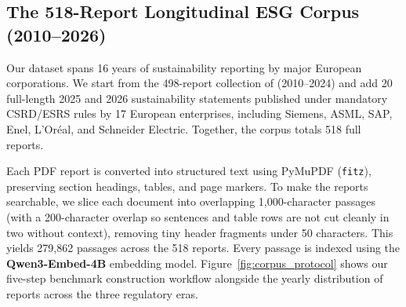 \documentclass[11pt,letterpaper]{article}
\newcommand{\model}[1]{\textbf{#1}}
\begin{document}
\subsection{The 518-Report Longitudinal ESG Corpus (2010--2026)}
Our dataset spans 16 years of sustainability reporting by major European corporations. We start from the 498-report collection of \citet{saad2026empirical} (2010--2024) and add 20 full-length 2025 and 2026 sustainability statements published under mandatory CSRD/ESRS rules by 17 European enterprises, including Siemens, ASML, SAP, Enel, L'Or{\'e}al, and Schneider Electric. Together, the corpus totals 518 full reports.

Each PDF report is converted into structured text using PyMuPDF (\texttt{fitz}), preserving section headings, tables, and page markers. To make the reports searchable, we slice each document into overlapping 1,000-character passages (with a 200-character overlap so sentences and table rows are not cut cleanly in two without context), removing tiny header fragments under 50 characters. This yields 279,862 passages across the 518 reports. Every passage is indexed using the \model{Qwen3-Embed-4B} embedding model. Figure~\ref{fig:corpus_protocol} shows our five-step benchmark construction workflow alongside the yearly distribution of reports across the three regulatory eras.
\end{document}
